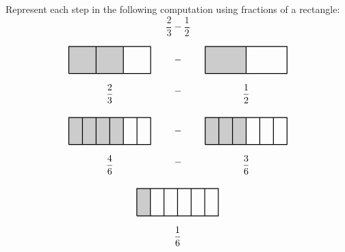 \documentclass[11pt,letterpaper]{article}
\begin{document}

 Represent each step in the following computation using fractions of a rectangle:
	\[
	\dfrac{2}{3} - \dfrac{1}{2}
	\] \pspace

\sol
	\[
	\begin{tikzpicture}
	\fill[gray!40] (0,0) -- (2,0) -- (2,1) -- (0,1);
	\draw[line width= 0.03cm] (0,0) -- (3,0) -- (3,1) -- (0,1) -- (0,0);
	\draw[line width= 0.03cm] (1,0) -- (1,1);
	\draw[line width= 0.03cm] (2,0) -- (2,1);
	\node at (1.5,-0.75) {$\dfrac{2}{3}$};
	
	\node at (4,0.5) {$-$};
	\node at (4,-0.65) {$-$};
	
	\fill[gray!40] (5,0) -- (6.5,0) -- (6.5,1) -- (5,1) -- (5,0);
	\draw[line width= 0.03cm] (5,0) -- (8,0) -- (8,1) -- (5,1) -- (5,0);
	\draw[line width= 0.03cm] (6.5,0) -- (6.5,1);
	\node at (6.5,-0.75) {$\dfrac{1}{2}$};
	\end{tikzpicture}
	\] \pspace

	\[
	\begin{tikzpicture}
	\fill[gray!40] (0,0) -- (2,0) -- (2,1) -- (0,1);
	\draw[line width= 0.03cm] (0,0) -- (3,0) -- (3,1) -- (0,1) -- (0,0);
	\draw[line width= 0.03cm] (1,0) -- (1,1);
	\draw[line width= 0.03cm] (2,0) -- (2,1);
	\draw[line width= 0.03cm] (0.5,0) -- (0.5,1);
	\draw[line width= 0.03cm] (1.5,0) -- (1.5,1);
	\draw[line width= 0.03cm] (2.5,0) -- (2.5,1);
	\node at (1.5,-0.75) {$\dfrac{4}{6}$};
	
	\node at (4,0.5) {$-$};
	\node at (4,-0.65) {$-$};
	
	\fill[gray!40] (5,0) -- (6.5,0) -- (6.5,1) -- (5,1) -- (5,0);
	\draw[line width= 0.03cm] (5,0) -- (8,0) -- (8,1) -- (5,1) -- (5,0);
	\draw[line width= 0.03cm] (5.5,0) -- (5.5,1);
	\draw[line width= 0.03cm](6,0) -- (6,1);
	\draw[line width= 0.03cm] (6.5,0) -- (6.5,1);
	\draw[line width= 0.03cm] (7,0) -- (7,1);
	\draw[line width= 0.03cm] (7.5,0) -- (7.5,1);
	\node at (6.5,-0.75) {$\dfrac{3}{6}$};
	\end{tikzpicture}
	\]

	\[
	\begin{tikzpicture}
	\fill[gray!40] (0,0) -- (0.5,0) -- (0.5,1) -- (0,1);
	\draw[line width= 0.03cm] (0,0) -- (3,0) -- (3,1) -- (0,1) -- (0,0);
	\draw[line width= 0.03cm] (1,0) -- (1,1);
	\draw[line width= 0.03cm] (2,0) -- (2,1);
	\draw[line width= 0.03cm] (0.5,0) -- (0.5,1);
	\draw[line width= 0.03cm] (1.5,0) -- (1.5,1);
	\draw[line width= 0.03cm] (2.5,0) -- (2.5,1);
	\node at (1.5,-0.75) {$\dfrac{1}{6}$};
	\end{tikzpicture}
	\]
\end{document}
